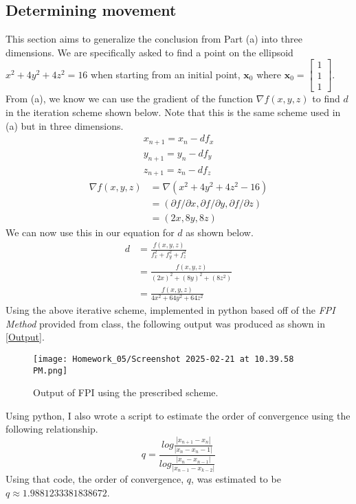\documentclass{article}
\begin{document}
\subsection{Determining movement}
This section aims to generalize the conclusion from Part (a) into three dimensions. We are specifically asked to find a point on the ellipsoid \(x^2+4y^2+4z^2 = 16\) when starting from an initial point, \(\mathbf{x}_0\) where \(\mathbf{x}_0=\begin{bmatrix}
    1 \\
    1 \\
    1
\end{bmatrix}\). From (a), we know we can use the gradient of the function \(\nabla f(x,y,z)\) to find \(d\) in the iteration scheme shown below. Note that this is the same scheme used in (a) but in three dimensions.
\[
\begin{split}
    x_{n+1} = x_n - df_x \\
    y_{n+1} = y_n - df_y \\
    z_{n+1} = z_n - df_z
\end{split}
\]
\[
\begin{split}
    \nabla f(x,y,z) &= \nabla(x^2+4y^2+4z^2-16) \\
    &= (\partial f/\partial x, \partial f/\partial y, \partial f/\partial z) \\
    &= (2x,8y,8z)
\end{split}
\]
We can now use this in our equation for \(d\) as shown below.
\[
\begin{split}
    d &= \frac{f(x,y,z)}{f_x^2+f_y^2+f_z^2} \\
    &= \frac{f(x,y,z)}{(2x)^2+(8y)^2+(8z^2)} \\
    &= \frac{f(x,y,z)}{4x^2+64y^2+64z^2}
\end{split}
\]
Using the above iterative scheme, implemented in python based off of the \textit{FPI Method} provided from class, the following output was produced as shown in \ref{Output}.
\begin{figure}[h!]
    \centering
    \texttt{[image: Homework\_05/Screenshot 2025-02-21 at 10.39.58 PM.png]}
    \caption{Output of FPI using the prescribed scheme.}
    \label{fig:Output}
\end{figure}
Using python, I also wrote a script to estimate the order of convergence using the following relationship.
\[
q = \frac{log\frac{|x_{n+1}-x_n|}{|x_n-x_n-1|}}{log\frac{|x_n-x_{n-1}|}{|x_{n-1}-x_{k-2}|}}
\]
Using that code, the order of convergence, \(q\), was estimated to be \(q\approx1.9881233381838672\).
\end{document}
